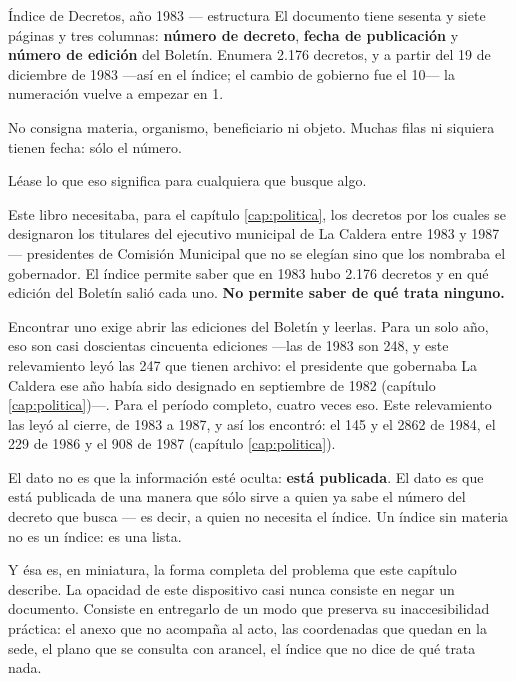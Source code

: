\begin{ficha}{Índice de Decretos, año 1983 --- estructura}
El documento tiene sesenta y siete páginas y tres columnas: \textbf{número de decreto}, \textbf{fecha de publicación} y \textbf{número de edición} del Boletín. Enumera 2.176 decretos, y a partir del 19 de diciembre de 1983 ---así en el índice; el cambio de gobierno fue el 10--- la numeración vuelve a empezar en 1.

No consigna materia, organismo, beneficiario ni objeto. Muchas filas ni siquiera tienen fecha: sólo el número.
\end{ficha}

\begin{cautela}
Léase lo que eso significa para cualquiera que busque algo.

Este libro necesitaba, para el capítulo \ref{cap:politica}, los decretos por los cuales se designaron los titulares del ejecutivo municipal de La Caldera entre 1983 y 1987 --- presidentes de Comisión Municipal que no se elegían sino que los nombraba el gobernador. El índice permite saber que en 1983 hubo 2.176 decretos y en qué edición del Boletín salió cada uno. \textbf{No permite saber de qué trata ninguno.}

Encontrar uno exige abrir las ediciones del Boletín y leerlas. Para un solo año, eso son casi doscientas cincuenta ediciones ---las de 1983 son 248, y este relevamiento leyó las 247 que tienen archivo: el presidente que gobernaba La Caldera ese año había sido designado en septiembre de 1982 (capítulo \ref{cap:politica})---. Para el período completo, cuatro veces eso. Este relevamiento las leyó al cierre, de 1983 a 1987, y así los encontró: el 145 y el 2862 de 1984, el 229 de 1986 y el 908 de 1987 (capítulo \ref{cap:politica}).

El dato no es que la información esté oculta: \textbf{está publicada}. El dato es que está publicada de una manera que sólo sirve a quien ya sabe el número del decreto que busca --- es decir, a quien no necesita el índice. Un índice sin materia no es un índice: es una lista.

Y ésa es, en miniatura, la forma completa del problema que este capítulo describe. La opacidad de este dispositivo casi nunca consiste en negar un documento. Consiste en entregarlo de un modo que preserva su inaccesibilidad práctica: el anexo que no acompaña al acto, las coordenadas que quedan en la sede, el plano que se consulta con arancel, el índice que no dice de qué trata nada.
\end{cautela}
